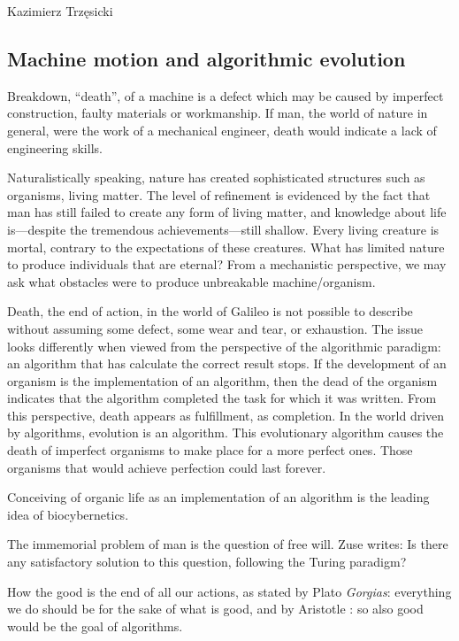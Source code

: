 \begin{artengenv}{Kazimierz Trzęsicki}
\subsection{Machine motion and algorithmic evolution} 

Breakdown, ``death'', of a machine is a defect which may be caused by imperfect construction, faulty materials or workmanship. If man, the world of nature in general, were the work of a mechanical engineer, death would indicate a lack of engineering skills.

Naturalistically speaking, nature has created sophisticated structures such as organisms, living matter. The level of refinement is evidenced by the fact that man has still failed to create any form of living matter, and knowledge about life is---despite the tremendous achievements---still shallow. Every living creature is mortal, contrary to the expectations of these creatures. What has limited nature to produce individuals that are eternal? From a mechanistic perspective, we may ask what obstacles were to produce unbreakable machine/organism.

Death, the end of action, in the  world of Galileo  is not possible to describe without assuming some defect, some wear and tear, or exhaustion. The issue looks differently when viewed from the perspective of the algorithmic paradigm: an algorithm that has calculate  the correct result  stops.  If the development of an organism is the implementation of an algorithm, then the dead of the organism indicates that the algorithm completed the task for which it was written. From this perspective, death appears as fulfillment, as completion. In the world driven by algorithms, evolution is an algorithm. This evolutionary algorithm causes the death of imperfect organisms to make place for a more perfect ones. Those organisms that would achieve perfection could last forever.

Conceiving of organic life as an implementation of an algorithm is the leading idea of biocybernetics.


The immemorial problem of man is the question of free will. Zuse \parencite[p.62--63]{German2012} writes:  Is there any satisfactory solution to this question, following the Turing paradigm?


How the good is the end of all our actions, as stated by Plato \emph{Gorgias}:  everything we do should be for the sake of what is good, and by Aristotle \parencite*[I.2]{Aristotle1999}:  so also good would be the goal of algorithms.



\end{artengenv}
